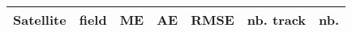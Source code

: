 \begin{center}
\begin{tabular}{|c|c|c|c|c|c|c|}
\hline
Satellite & field & ME & AE & RMSE & nb. track & nb.\\
\hline
\end{tabular}
\end{center}
